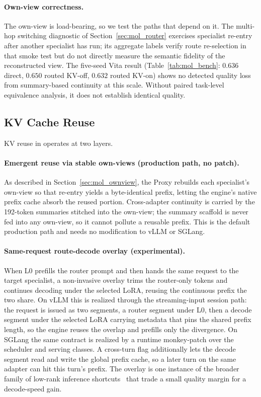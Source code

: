 \paragraph{Own-view correctness.}
The own-view is load-bearing, so we test the paths that depend on it. The multi-hop switching diagnostic of Section~\ref{sec:mol_router} exercises specialist re-entry after another specialist has run; its aggregate labels verify route re-selection in that smoke test but do not directly measure the semantic fidelity of the reconstructed view. The five-seed Vita result (Table~\ref{tab:mol_bench}: $0.636$ direct, $0.650$ routed KV-off, $0.632$ routed KV-on) shows no detected quality loss from summary-based continuity at this scale. Without paired task-level equivalence analysis, it does not establish identical quality.

\subsection{KV Cache Reuse}
\label{sec:mol_serving}

KV reuse in \molshort{} operates at two layers.

\paragraph{Emergent reuse via stable own-views (production path, no patch).}
As described in Section~\ref{sec:mol_ownview}, the Proxy rebuilds each specialist's own-view so that re-entry yields a byte-identical prefix, letting the engine's native prefix cache absorb the reused portion. Cross-adapter continuity is carried by the 192-token summaries stitched into the own-view; the summary scaffold is never fed into any own-view, so it cannot pollute a reusable prefix. This is the default production path and needs no modification to vLLM or SGLang.

\paragraph{Same-request route-decode overlay (experimental).}
When L0 prefills the router prompt and then hands the same request to the target specialist, a non-invasive overlay trims the router-only tokens and continues decoding under the selected LoRA, reusing the continuous prefix the two share. On vLLM this is realized through the streaming-input session path: the request is issued as two segments, a router segment under L0, then a decode segment under the selected LoRA carrying metadata that pins the shared prefix length, so the engine reuses the overlap and prefills only the divergence. On SGLang the same contract is realized by a runtime monkey-patch over the scheduler and serving classes. A cross-turn flag additionally lets the decode segment read and write the global prefix cache, so a later turn on the same adapter can hit this turn's prefix. The overlay is one instance of the broader family of low-rank inference shortcuts~\citep{zhou2026deputy} that trade a small quality margin for a decode-speed gain.

